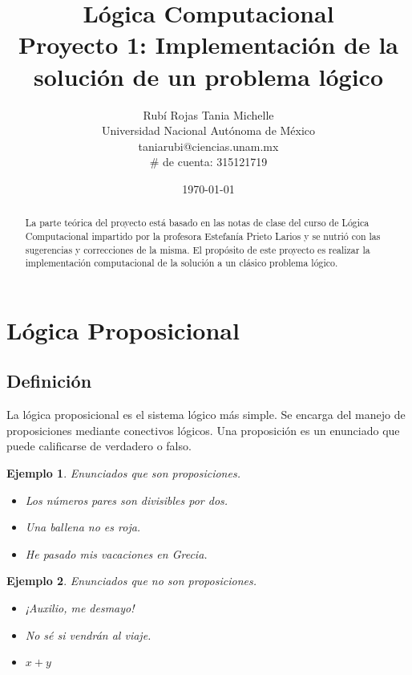 \documentclass[letterpaper,12pt]{article}
\title{Lógica Computacional \\ 
Proyecto 1: Implementación de la solución de un problema lógico}
\author{Rubí Rojas Tania Michelle \\
        Universidad Nacional Autónoma de México \\
        taniarubi@ciencias.unam.mx \\
        $\#$ de cuenta: 315121719}
\date{\today}
\newtheorem{ejem}{Ejemplo}[]
\begin{document}
    \maketitle

    \begin{abstract}
        La parte teórica del proyecto está basado en las notas de clase del
        curso de Lógica Computacional impartido por la profesora Estefanía 
        Prieto Larios y se nutrió con las sugerencias y correcciones de la 
        misma. El propósito de este proyecto es realizar la implementación 
        computacional de la solución a un clásico problema lógico.
    \end{abstract}

    \section{Lógica Proposicional}

    \subsection{Definición}
    La lógica proposicional es el sistema lógico más simple. Se encarga del 
    manejo de proposiciones mediante conectivos lógicos. Una proposición es
    un enunciado que puede calificarse de verdadero o falso. 
    \begin{ejem} 
        Enunciados que son proposiciones.
        \begin{itemize}
            \item Los números pares son divisibles por dos. 
            \item Una ballena no es roja.
            \item He pasado mis vacaciones en Grecia.
        \end{itemize}
    \end{ejem}

    \begin{ejem} 
        Enunciados que no son proposiciones.
        \begin{itemize}
            \item ¡Auxilio, me desmayo!
            \item No sé si vendrán al viaje.
            \item $x + y$
        \end{itemize}
    \end{ejem}
\end{document}
